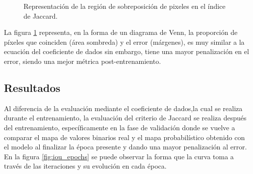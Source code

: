 \def\rectA{(0,0) rectangle (2,2)}
\def\rectB{(1,-1) rectangle (3,1)}

\begin{figure}[h!]
    \centering
    \caption{Representación de la región de sobreposición de pixeles en el índice de Jaccard.}
    \label{fig:jacc_inter}
\end{figure}

La figura \ref{fig:jacc_inter} representa, en la forma de un diagrama de Venn, la proporción de píxeles que coinciden (área sombreda) y el error (márgenes), es muy similar a la ecuación del coeficiente de dados sin embargo, tiene una mayor penalización en el error, siendo una mejor métrica post-entrenamiento.

\subsection{Resultados}
Al diferencia de la evaluación mediante el coeficiente de dados,la cual se realiza durante el entrenamiento, la evaluación del criterio de Jaccard se realiza después del entrenamiento, específicamente en la fase de validación donde se vuelve a comparar el mapa de valores binarios real y el mapa probabilístico obtenido con el modelo al finalizar la época presente y dando una mayor penalización al error. En la figura \ref{fig:iou_epochs} se puede observar la forma que la curva toma a través de las iteraciones y su evolución en cada época.

